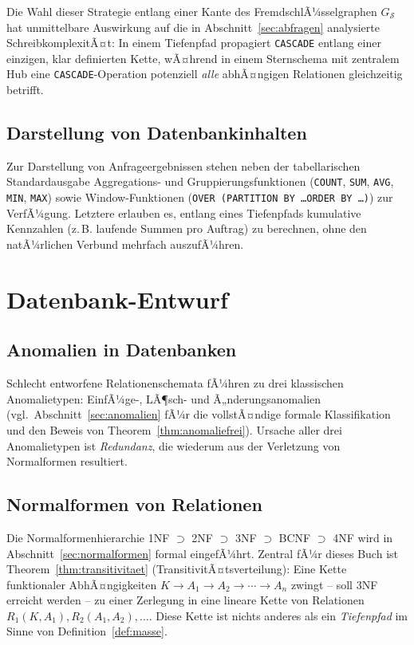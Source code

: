 ﻿\documentclass[a4paper,12pt]{report}
\theoremstyle{definition}
\theoremstyle{remark}
\begin{document}
Die Wahl dieser Strategie entlang einer Kante des FremdschlÃ¼sselgraphen
$G_{\mathcal{S}}$ hat unmittelbare Auswirkung auf die in
Abschnitt~\ref{sec:abfragen} analysierte
SchreibkomplexitÃ¤t: In einem Tiefenpfad propagiert \texttt{CASCADE}
entlang einer einzigen, klar definierten Kette, wÃ¤hrend in einem
Sternschema mit zentralem Hub eine \texttt{CASCADE}-Operation potenziell
\emph{alle} abhÃ¤ngigen Relationen gleichzeitig betrifft.

\section{Darstellung von Datenbankinhalten}

Zur Darstellung von Anfrageergebnissen stehen neben der tabellarischen
Standardausgabe Aggregations- und Gruppierungsfunktionen
(\texttt{COUNT}, \texttt{SUM}, \texttt{AVG}, \texttt{MIN}, \texttt{MAX})
sowie Window-Funktionen (\texttt{OVER (PARTITION BY \ldots ORDER BY
\ldots)}) zur VerfÃ¼gung. Letztere erlauben es, entlang eines
Tiefenpfads kumulative Kennzahlen (z.\,B. laufende Summen pro
Auftrag) zu berechnen, ohne den natÃ¼rlichen Verbund mehrfach
auszufÃ¼hren.

\chapter{Datenbank-Entwurf}
\label{ch:entwurf}

\section{Anomalien in Datenbanken}
\label{sec:anomalien-kurz}

Schlecht entworfene Relationenschemata fÃ¼hren zu drei klassischen
Anomalietypen: EinfÃ¼ge-, LÃ¶sch- und Ã„nderungsanomalien (vgl.\
Abschnitt~\ref{sec:anomalien} fÃ¼r die vollstÃ¤ndige formale
Klassifikation und den Beweis von Theorem~\ref{thm:anomaliefrei}).
Ursache aller drei Anomalietypen ist \emph{Redundanz}, die wiederum aus
der Verletzung von Normalformen resultiert.

\section{Normalformen von Relationen}
\label{sec:normalformen-kurz}

Die Normalformenhierarchie 1NF $\supset$ 2NF $\supset$ 3NF $\supset$
BCNF $\supset$ 4NF wird in Abschnitt~\ref{sec:normalformen} formal
eingefÃ¼hrt. Zentral fÃ¼r dieses Buch ist
Theorem~\ref{thm:transitivitaet} (TransitivitÃ¤tsverteilung): Eine
Kette funktionaler AbhÃ¤ngigkeiten $K \to A_1 \to A_2 \to \cdots \to A_n$
zwingt -- soll 3NF erreicht werden -- zu einer Zerlegung in eine lineare
Kette von Relationen $R_1(K,A_1), R_2(A_1,A_2), \ldots$. Diese Kette ist
nichts anderes als ein \emph{Tiefenpfad} im Sinne von
Definition~\ref{def:masse}.
\end{document}
